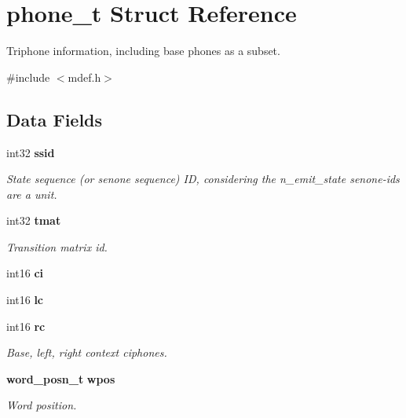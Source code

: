 \section{phone\-\_\-t Struct Reference}
\label{structphone__t}


Triphone information, including base phones as a subset.  




{\ttfamily \#include $<$mdef.\-h$>$}

\subsection*{Data Fields}
\begin{DoxyCompactItemize}
\item 
int32 {\bf ssid}
\begin{DoxyCompactList}\small\item\em State sequence (or senone sequence) I\-D, considering the n\-\_\-emit\-\_\-state senone-\/ids are a unit. \end{DoxyCompactList}\item 
int32 {\bf tmat}\label{structphone__t_acbe38b7fc991bfbcb745fb6131d812f0}

\begin{DoxyCompactList}\small\item\em Transition matrix id. \end{DoxyCompactList}\item 
int16 {\bfseries ci}\label{structphone__t_a0a895c57dccac46699fa3589e42b21d5}

\item 
int16 {\bfseries lc}\label{structphone__t_a2a473afd43114648de71a9444aa54641}

\item 
int16 {\bf rc}\label{structphone__t_a334106cbedf3d95a6bdebc4704e028cd}

\begin{DoxyCompactList}\small\item\em Base, left, right context ciphones. \end{DoxyCompactList}\item 
{\bf word\-\_\-posn\-\_\-t} {\bf wpos}\label{structphone__t_a5436db1dd178ef5ead83359c84963c83}

\begin{DoxyCompactList}\small\item\em Word position. \end{DoxyCompactList}\end{DoxyCompactItemize}


